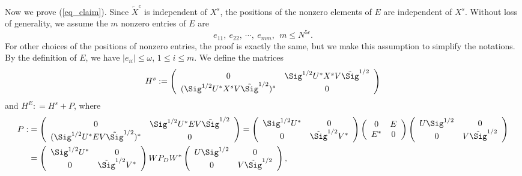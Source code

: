 Now we prove (\ref{eq_claim}). Since $ \tilde{X}^c $ is independent of $X^s$, the positions of the nonzero elements of $E$ are independent of $X^s$. Without loss of generality, we assume the $m$ nonzero entries of $E$ are
\begin{equation}
e_{11}, \ e_{22}, \ \cdots,  \ e_{mm}, \ \ m \le N^{5\epsilon}. \label{STRUCTURE}
\end{equation}
For other choices of the positions of nonzero entries, the proof is exactly the same, but we make this assumption to simplify the notations. By the definition of $E$, we have $|e_{ii}| \le \omega$, $1\le i \le m$. We define the matrices
$$  H^s : = \left( {\begin{array}{*{20}c}
   { 0 } & \Sig^{1/2} U^{*}X^s V\tilde \Sig^{1/2}  \\
   {(\Sig^{1/2} U^{*}X^s V\tilde \Sig^{1/2})^*} & {0}  \\
   \end{array}} \right)$$ 
and $H^{E} : = H^s + P$, where
\begin{align*}
P: &= \left( {\begin{array}{*{20}c}
   { 0 } & \Sig^{1/2} U^{*}E V\tilde \Sig^{1/2}   \\
   { (\Sig^{1/2} U^{*}E V\tilde \Sig^{1/2} )^*} & {0}  \\
   \end{array}} \right)= \left( {\begin{array}{*{20}c}
   {\Sig^{1/2} U^{*}} & 0  \\
   { 0} & {\tilde \Sig^{1/2}V^*}  \\
   \end{array}} \right)\left( {\begin{array}{*{20}c}
   { 0 } & E  \\
   { E^*} & {0}  \\
   \end{array}} \right)\left( {\begin{array}{*{20}c}
   {U\Sig^{1/2} } & 0  \\
   { 0} & {V\tilde \Sig^{1/2}}  \\
   \end{array}} \right)\\
  & = \left( {\begin{array}{*{20}c}
   {\Sig^{1/2} U^{*}} & 0  \\
   { 0} & {\tilde \Sig^{1/2}V^*}  \\
   \end{array}} \right)W P_DW^* \left( {\begin{array}{*{20}c}
   {U\Sig^{1/2} } & 0  \\
   { 0} & {V\tilde \Sig^{1/2}}  \\
   \end{array}} \right),
   \end{align*}
